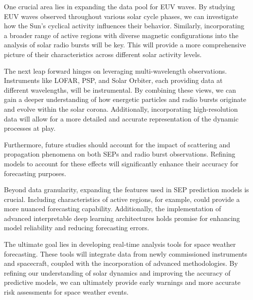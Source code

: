 One crucial area lies in expanding the data pool for EUV waves. By studying EUV waves observed throughout various solar cycle phases, we can investigate how the Sun's cyclical activity influences their behavior. Similarly, incorporating a broader range of active regions with diverse magnetic configurations into the analysis of solar radio bursts will be key. This will provide a more comprehensive picture of their characteristics across different solar activity levels.

The next leap forward hinges on leveraging multi-wavelength observations. Instruments like LOFAR, PSP, and Solar Orbiter, each providing data at different wavelengths, will be instrumental. By combining these views, we can gain a deeper understanding of how energetic particles and radio bursts originate and evolve within the solar corona. Additionally, incorporating high-resolution data will allow for a more detailed and accurate representation of the dynamic processes at play.

Furthermore, future studies should account for the impact of scattering and propagation phenomena on both SEPs and radio burst observations. Refining models to account for these effects will significantly enhance their accuracy for forecasting purposes.

Beyond data granularity, expanding the features used in SEP prediction models is crucial.  Including characteristics of active regions, for example, could provide a more nuanced forecasting capability.  Additionally, the implementation of advanced interpretable deep learning architectures holds promise for enhancing model reliability and reducing forecasting errors.

The ultimate goal lies in developing real-time analysis tools for space weather forecasting. These tools will integrate data from newly commissioned instruments and spacecraft, coupled with the incorporation of advanced methodologies. By refining our understanding of solar dynamics and improving the accuracy of predictive models, we can ultimately provide early warnings and more accurate risk assessments for space weather events.





